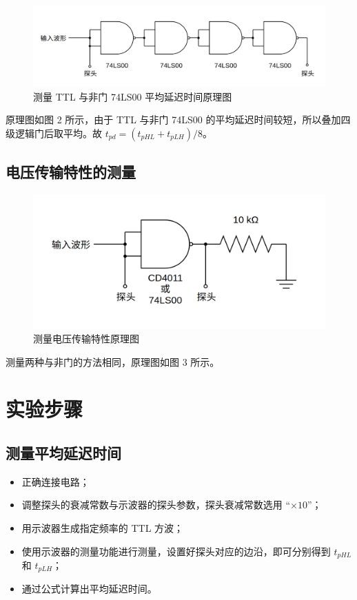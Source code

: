 \documentclass[a4paper]{article}
\begin{document}
        \begin{figure}[H]
            \centering
            \includegraphics[width=0.7\linewidth]{figures/f2}
            \caption{测量 TTL 与非门 74LS00 平均延迟时间原理图}
        \end{figure}

        \par 原理图如图 2 所示，由于 TTL 与非门 74LS00 的平均延迟时间较短，所以叠加四级逻辑门后取平均。故 $t_{pd}=(t_{pHL}+t_{pLH})/8$。

    \subsection{电压传输特性的测量}

        \begin{figure}[H]
            \centering
            \includegraphics[width=0.7\linewidth]{figures/f3}
            \caption{测量电压传输特性原理图}
        \end{figure}

		\par 测量两种与非门的方法相同，原理图如图 3 所示。

\section{实验步骤}

    \subsection{测量平均延迟时间}

        \begin{itemize}
            \item 正确连接电路；
            \item 调整探头的衰减常数与示波器的探头参数，探头衰减常数选用 “$\times 10$”；
            \item 用示波器生成指定频率的 TTL 方波；
            \item 使用示波器的测量功能进行测量，设置好探头对应的边沿，即可分别得到 $t_{pHL}$ 和 $t_{pLH}$；
            \item 通过公式计算出平均延迟时间。
        \end{itemize}
\end{document}
